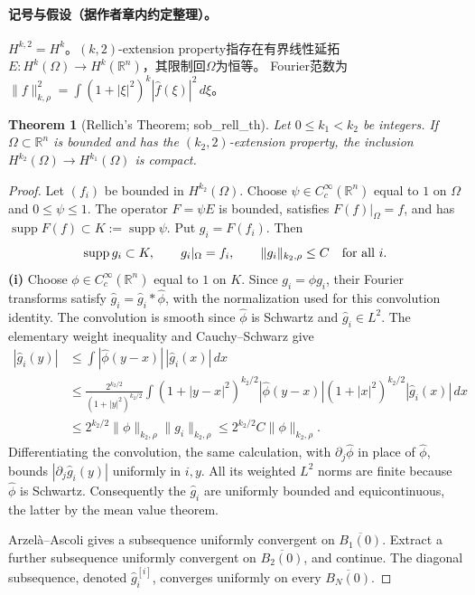 \documentclass[UTF8,11pt]{ctexart}
\newtheorem*{theorem}{Theorem}
\theoremstyle{definition}
\DeclareMathOperator{\supp}{supp}
\begin{document}
\paragraph{记号与假设（据作者章内约定整理）。}
$H^{k,2}=H^k$。$(k,2)$-extension property指存在有界线性延拓
$E:H^k(\Omega)\to H^k(\mathbb R^n)$，其限制回$\Omega$为恒等。
Fourier范数为$\|f\|_{k,\rho}^2=\int(1+|\xi|^2)^k|\widehat f(\xi)|^2\,d\xi$。
\begin{theorem}[Rellich's Theorem; sob\_rell\_th]
Let $0\leq k_1<k_2$ be integers. If $\Omega\subset\mathbb R^n$ is
bounded and has the $(k_2,2)$-extension property, the inclusion
$H^{k_2}(\Omega)\to H^{k_1}(\Omega)$ is compact.
\end{theorem}
\begin{proof}
Let $(f_i)$ be bounded in $H^{k_2}(\Omega)$.
Choose $\psi\in C_c^\infty(\mathbb R^n)$ equal to $1$ on $\Omega$ and
$0\leq\psi\leq1$. The operator $F=\psi E$ is bounded, satisfies
$F(f)|_\Omega=f$, and has $\supp F(f)\subset K:=\supp\psi$.
Put $g_i=F(f_i)$. Then
\[
\supp g_i\subset K,\qquad g_i|_\Omega=f_i,\qquad
\|g_i\|_{k_2,\rho}\leq C\quad\hbox{for all }i.
\]
\textbf{(i)} Choose $\phi\in C_c^\infty(\mathbb R^n)$ equal to $1$ on $K$.
Since $g_i=\phi g_i$, their Fourier transforms satisfy
$\widehat g_i=\widehat g_i*\widehat\phi$, with the normalization used for
this convolution identity. The convolution is smooth since
$\widehat\phi$ is Schwartz and $\widehat g_i\in L^2$.
The elementary weight inequality and Cauchy--Schwarz give
\begin{align*}
|\widehat g_i(y)|
&\leq\int|\widehat\phi(y-x)|\,|\widehat g_i(x)|\,dx\\
&\leq\frac{2^{k_2/2}}{(1+|y|^2)^{k_2/2}}
\int(1+|y-x|^2)^{k_2/2}|\widehat\phi(y-x)|
     (1+|x|^2)^{k_2/2}|\widehat g_i(x)|\,dx\\
&\leq2^{k_2/2}\|\phi\|_{k_2,\rho}\|g_i\|_{k_2,\rho}
\leq2^{k_2/2}C\|\phi\|_{k_2,\rho}.
\end{align*}
Differentiating the convolution, the same calculation, with
$\partial_j\widehat\phi$ in place of $\widehat\phi$, bounds
$|\partial_j\widehat g_i(y)|$ uniformly in $i,y$.
All its weighted $L^2$ norms are finite because $\widehat\phi$ is Schwartz.
Consequently the $\widehat g_i$ are uniformly bounded and equicontinuous,
the latter by the mean value theorem.

Arzel\`a--Ascoli gives a subsequence uniformly convergent on
$\overline{B_1(0)}$. Extract a further subsequence uniformly convergent
on $\overline{B_2(0)}$, and continue. The diagonal subsequence, denoted
$\widehat g_i^{[i]}$, converges uniformly on every $\overline{B_N(0)}$.


\end{proof}
\end{document}
